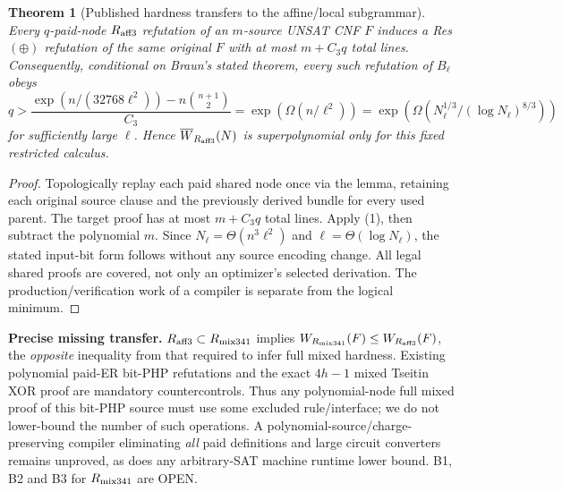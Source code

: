 \documentclass[11pt]{article}
\newtheorem{theorem}{Theorem}
\begin{document}
\begin{theorem}[Published hardness transfers to the affine/local subgrammar]
Every $q$-paid-node $R_{\rm aff3}$ refutation of an $m$-source UNSAT CNF $F$ induces a Res$(\oplus)$ refutation of \emph{the same original $F$} with at most $m+C_3q$ total lines. Consequently, conditional on Braun's stated theorem, every such refutation of $B_\ell$ obeys
\[
\boxed{\displaystyle
q>\frac{\exp(n/(32768\ell^2))-n\binom{n+1}{2}}{C_3}
=\exp(\Omega(n/\ell^2))
=\exp\!\left(\Omega(N_\ell^{1/3}/(\log N_\ell)^{8/3})\right)}
\tag{2}
\]
for sufficiently large $\ell$. Hence $\overline W_{R_{\rm aff3}}(N)$ is superpolynomial \emph{only for this fixed restricted calculus}.
\end{theorem}
\begin{proof}
Topologically replay each paid shared node once via the lemma, retaining each original source clause and the previously derived bundle for every used parent. The target proof has at most $m+C_3q$ total lines. Apply (1), then subtract the polynomial $m$. Since $N_\ell=\Theta(n^3\ell^2)$ and $\ell=\Theta(\log N_\ell)$, the stated input-bit form follows without any source encoding change. All legal shared proofs are covered, not only an optimizer's selected derivation. The production/verification work of a compiler is separate from the logical minimum.
\end{proof}

\noindent\textbf{Precise missing transfer.} $R_{\rm aff3}\subset R_{\rm mix341}$ implies $W_{R_{\rm mix341}}(F)\le W_{R_{\rm aff3}}(F)$, the \emph{opposite} inequality from that required to infer full mixed hardness. Existing polynomial paid-ER bit-PHP refutations and the exact $4h-1$ mixed Tseitin XOR proof are mandatory countercontrols. Thus any polynomial-node full mixed proof of this bit-PHP source must use some excluded rule/interface; we do not lower-bound the number of such operations. A polynomial-source/charge-preserving compiler eliminating \emph{all} paid definitions and large circuit converters remains unproved, as does any arbitrary-SAT machine runtime lower bound. B1, B2 and B3 for $R_{\rm mix341}$ are OPEN.
\end{document}
